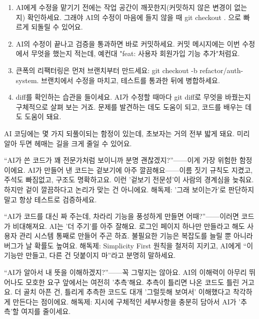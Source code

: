 \begin{enumerate}
  \item AI에게 수정을 맡기기 전에는 작업 공간이 깨끗한지(커밋하지 않은 변경이 없는지) 확인하세요. 그래야 AI의 수정이 마음에 들지 않을 때 git checkout . 으로 빠르게 되돌릴 수 있어요.
  \item AI의 수정이 끝나고 검증을 통과하면 바로 커밋하세요. 커밋 메시지에는 이번 수정에서 무엇을 했는지 적는데, 예컨대 "feat: 사용자 회원가입 기능 추가"처럼요.
  \item 큰폭의 리팩터링은 먼저 브랜치부터 만드세요: git checkout -b refactor/auth-system. 브랜치에서 수정을 마치고, 테스트를 통과한 뒤에 병합하세요.
  \item diff를 확인하는 습관을 들이세요. AI가 수정할 때마다 git diff로 무엇을 바꿨는지 구체적으로 살펴 보는 거죠. 문제를 발견하는 데도 도움이 되고, 코드를 배우는 데도 도움이 돼요.
\end{enumerate}


AI 코딩에는 몇 가지 되풀이되는 함정이 있는데, 초보자는 거의 전부 밟게 돼요. 미리 알아 두면 헤매는 길을 크게 줄일 수 있어요.


“AI가 쓴 코드가 꽤 전문가처럼 보이니까 분명 괜찮겠지?”——이게 가장 위험한 함정이에요. AI가 만들어 낸 코드는 겉보기에 아주 깔끔해요——이름 짓기 규칙도 지켰고, 주석도 빠짐없고, 구조도 명확하고요. 이런 '겉보기 전문성'이 사람의 경계심을 늦춰요. 하지만 겉이 깔끔하다고 논리가 맞는 건 아니에요. 해독제: '그래 보이는가'로 판단하지 말고 항상 테스트로 검증하세요.


“AI가 코드를 대신 짜 주는데, 차라리 기능을 풍성하게 만들면 어때?”——이러면 코드가 비대해져요. AI는 '더 주기'를 아주 잘해요. 로그인 페이지 하나만 만들라고 해도 사용자 관리 시스템 통째로 만들어 주곤 하죠. 불필요한 기능은 복잡도를 늘릴 뿐 아니라 버그가 날 확률도 높여요. 해독제: Simplicity First 원칙을 철저히 지키고, AI에게 “이 기능만 만들고, 다른 건 덧붙이지 마”라고 분명히 말하세요.


“AI가 알아서 내 뜻을 이해하겠지?”——꼭 그렇지는 않아요. AI의 이해력이 아무리 뛰어나도 모호한 요구 앞에서는 여전히 '추측'해요. 추측이 틀리면 나온 코드도 틀린 거고요. 더 골치 아픈 건, 틀리게 추측한 코드도 대개 '그럴듯해 보여서' 이해했다고 착각하게 만든다는 점이에요. 해독제: 지시에 구체적인 세부사항을 충분히 담아서 AI가 '추측'할 여지를 줄이세요.

